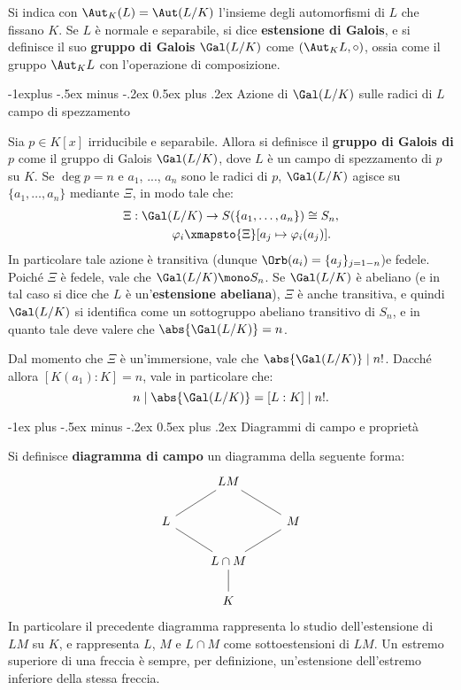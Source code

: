 \documentclass[10pt,landscape]{article}
\makeatletter
\renewcommand{\section}{\@startsection{section}{1}{0mm}%
	{-1ex plus -.5ex minus -.2ex}%
	{0.5ex plus .2ex}%
	{\normalfont\large\bfseries}}
\renewcommand{\subsection}{\@startsection{subsection}{2}{0mm}%
	{-1explus -.5ex minus -.2ex}%
	{0.5ex plus .2ex}%
	{\normalfont\normalsize\bfseries}}
\makeatother
\begin{document}
\begin{multicols}{3}
		
		Si indica con $\Aut_K(L) = \Aut(L / K)$ l'insieme
		degli automorfismi di $L$ che fissano $K$. Se
		$L$ è normale e separabile, si dice
		\textbf{estensione di Galois}, e si definisce
		il suo \textbf{gruppo di Galois}
		$\Gal(L / K)$ come $(\Aut_K L, \circ)$, ossia come
		il gruppo $\Aut_K L$ con l'operazione di
		composizione.
		
		
		\subsection{Azione di $\Gal(L / K)$ sulle radici di $L$ campo di spezzamento}
		
		Sia $p \in K[x]$ irriducibile e separabile.
		Allora si definisce
		il \textbf{gruppo di Galois di $p$} come il gruppo
		di Galois $\Gal(L / K)$, dove $L$ è un campo di
		spezzamento di $p$ su $K$. Se $\deg p = n$ e
		$a_1$, ..., $a_n$ sono le radici di $p$,
		$\Gal(L / K)$ agisce su $\{a_1, \ldots, a_n\}$
		mediante $\Xi$, in modo tale che:
		\vskip -0.3in
		\begin{equation*}
		\begin{split}
			\Xi : \Gal(&L / K) \to S(\{a_1, \ldots, a_n\}) \cong S_n, \\
			&\varphi_i \xmapsto{\Xi} [a_j \mapsto \varphi_i(a_j)].
		\end{split}
		\end{equation*}
		\vskip -0.2in
		In particolare tale azione è transitiva (dunque $\Orb(a_i) = \{a_j\}_{j=1-n}$)e fedele. Poiché $\Xi$ è fedele, vale che
		$\Gal(L / K) \mono S_n$. Se $\Gal(L / K)$ è abeliano
		(e in tal caso si dice che $L$ è un'\textbf{estensione abeliana}), $\Xi$ è anche transitiva, e quindi
		$\Gal(L / K)$ si identifica come un sottogruppo
		abeliano transitivo di $S_n$, e in quanto tale deve
		valere che $\abs{\Gal(L / K)} = n$. \medskip


		
		Dal momento che $\Xi$ è un'immersione, vale
		che $\abs{\Gal(L / K)} \mid n!$. Dacché allora
		$[K(a_1) : K] = n$, vale in particolare che:
		\[ n \mid \abs{\Gal(L / K)} = [L : K] \mid n!. \]
		
		
		\section{Diagrammi di campo e proprietà}
		
		
		Si definisce \textbf{diagramma di campo} un
		diagramma della seguente forma:
		\[\begin{tikzcd}
			& LM \\
			L & {} & M \\
			& {L \cap M} \\
			& K
			\arrow[no head, from=4-2, to=3-2]
			\arrow[no head, from=3-2, to=2-1]
			\arrow[no head, from=2-1, to=1-2]
			\arrow[no head, from=3-2, to=2-3]
			\arrow[no head, from=2-3, to=1-2]
		\end{tikzcd}\]
		In particolare il precedente diagramma rappresenta
		lo studio dell'estensione di $LM$ su $K$, e
		rappresenta $L$, $M$ e $L \cap M$ come sottoestensioni
		di $LM$. Un estremo superiore di una freccia è sempre,
		per definizione, un'estensione dell'estremo inferiore
		della stessa freccia. \medskip
		

\end{multicols}
\end{document}

